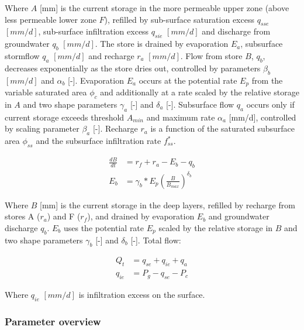Where $A$ [mm] is the current storage in the more permeable upper zone (above less permeable lower zone $F$), refilled by sub-surface saturation excess $q_{sse}$ $[mm/d]$, sub-surface infiltration excess $q_{sie}$ $[mm/d]$ and discharge from groundwater $q_b$ $[mm/d]$. 
The store is drained by evaporation $E_a$, subsurface stormflow $q_a$ $[mm/d]$ and recharge $r_a$ $[mm/d]$.
Flow from store $B$, $q_b$, decreases exponentially as the store dries out, controlled by parameters $\beta_b$ $[mm/d]$ and $\alpha_b$ [-]. 
Evaporation $E_a$ occurs at the potential rate $E_p$ from the variable saturated area $\phi_c$ and additionally at a rate scaled by the relative storage in $A$ and two shape parameters $\gamma_a$ [-] and $\delta_a$ [-].
Subsurface flow $q_a$ occurs only if current storage exceeds threshold $A_{min}$ and maximum rate $\alpha_a$ [mm/d], controlled by scaling parameter $\beta_a$ [-].
Recharge $r_a$ is a function of the saturated subsurface area $\phi_{ss}$ and the subsurface infiltration rate $f_{ss}^*$.

\begin{align}
	\frac{dB}{dt} &= r_f+r_a - E_b - q_b \\
	E_b &= \gamma_b*E_p\left(\frac{B}{B_{max}}\right)^{\delta_b}
\end{align}
  
Where $B$ [mm] is the current storage in the deep layers, refilled by recharge from stores A ($r_a$) and F ($r_f$), and drained by evaporation $E_b$ and groundwater discharge $q_b$.
$E_b$ uses the potential rate $E_p$ scaled by the relative storage in $B$ and two shape parameters $\gamma_b$ [-] and $\delta_b$ [-].
Total flow:

\begin{align}
	Q_t &=q_{se}+q_{ie}+q_a \\
	q_{ie} &= P_g-q_{se}-P_c
\end{align}

Where $q_{ie}$  $[mm/d]$ is infiltration excess on the surface.

\newpage
\subsubsection{Parameter overview}


